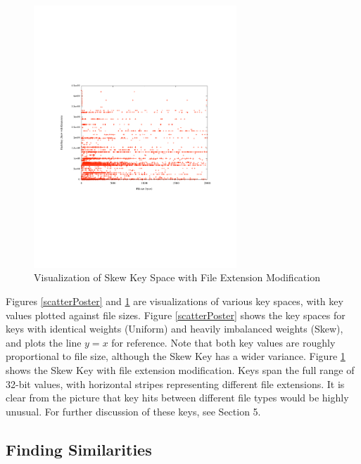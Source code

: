 \documentclass[10pt, twocolumn]{article}
\begin{document}
 \begin{figure}[h] 
 \centering
\includegraphics[width= 3in]{skewExtScatter.pdf}
\caption{Visualization of  Skew Key Space with File Extension Modification}
\label{scatterExtension} 
\end{figure}   

Figures \ref{scatterPoster} and \ref{scatterExtension} are visualizations of various key spaces, with key values plotted against file sizes.  Figure \ref{scatterPoster} shows the key spaces for keys with identical weights (Uniform) and heavily imbalanced weights (Skew), and plots the line $y=x$ for reference.  Note that both key values are roughly proportional to file size, although the Skew Key has a wider variance.  Figure \ref{scatterExtension} shows the Skew Key with file extension modification.  Keys span the full range of 32-bit values, with horizontal stripes representing different file extensions.  It is clear from the picture that key hits between different file types would be highly unusual.  For further discussion of these keys, see Section 5.



\subsection{Finding Similarities}
\end{document}
